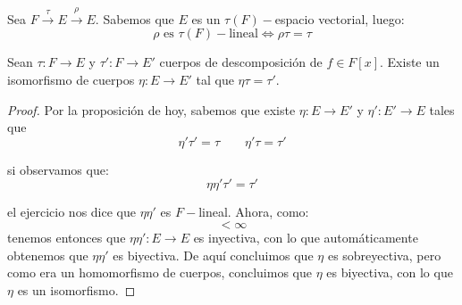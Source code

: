 \begin{ejercicio} %
    Sea $F\stackrel{\tau}{\to}E\stackrel{\rho}{\to}E$. Sabemos que $E$ es un $\tau(F)-$espacio vectorial, luego: 
    \begin{equation*}
        \rho \text{\ es\ } \tau(F)-\text{lineal} \Longleftrightarrow \rho\tau = \tau
    \end{equation*}
\end{ejercicio}

\begin{teo}
    Sean $\tau:F\to E$ y $\tau':F\to E'$ cuerpos de descomposición de $f\in F[x]$. Existe un isomorfismo de cuerpos $\eta:E\to E'$ tal que $\eta \tau = \tau'$.
    \begin{proof}
        Por la proposición de hoy, sabemos que existe $\eta:E\to E'$ y $\eta':E'\to E$ tales que 
        \begin{equation*}
            \eta'\tau' = \tau\qquad \eta'\tau = \tau'
        \end{equation*}

        si observamos que:
        \begin{equation*}
            \eta\eta'\tau' = \tau'
        \end{equation*}

        el ejercicio nos dice que $\eta\eta'$ es $F-$lineal. Ahora, como:
        \begin{equation*}
            [E':\tau'(F)] < \infty
        \end{equation*}
        tenemos entonces que $\eta\eta':E\to E$ es inyectiva, con lo que automáticamente obtenemos que $\eta\eta'$ es biyectiva. De aquí concluimos que $\eta$ es sobreyectiva, pero como era un homomorfismo de cuerpos, concluimos que $\eta$ es biyectiva, con lo que $\eta$ es un isomorfismo.
    \end{proof}
\end{teo}

